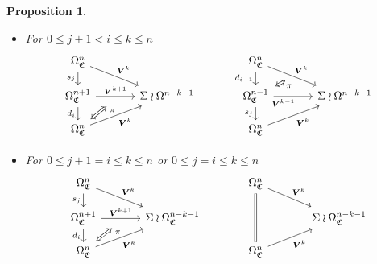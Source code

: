 \documentclass[a4paper,10pt
,draft
]{article}%
\numberwithin{equation}{section}
\numberwithin{figure}{section}
\newtheorem{proposition}[equation]{Proposition}%
\theoremstyle{definition} %
\newcommand{\1}{\ensuremath{\mathbbm 1}}%
\begin{document}
\begin{proposition}
\begin{itemize}
		\item[(DF1)]
		For $0 \leq j+1 < i \leq k \leq n $
		\begin{equation}
		\begin{tikzcd}[row sep = 12pt, column sep = 35pt]
		\Omega^{n}_{\mathfrak{C}}
		\arrow{dr}[swap,name=U]{}{\boldsymbol{V}^{k}} \arrow{d}[swap]{s_j} &
		&
		\Omega^{n}_{\mathfrak{C}}
		\arrow{dr}[swap,name=UUU]{}{\boldsymbol{V}^{k}} \arrow{d}[swap]{d_{i-1}} &
		\\
		|[alias=V]|
		\Omega^{n+1}_{\mathfrak{C}} \ar{r}{\boldsymbol{V}^{k+1}}[swap,name=UU]{} \arrow{d}[swap]{d_i}&
		\Sigma \wr \Omega^{n-k-1}
		&
		|[alias=VVV]|
		\Omega^{n-1}_{\mathfrak{C}} \ar{r}[near start, swap]{\boldsymbol{V}^{k-1}}[swap,name=UUUU]{} \ar{d}[swap]{s_j} &
		\Sigma \wr \Omega^{n-k-1}
		\\
		|[alias=VV]|
		\Omega^{n}_{\mathfrak{C}} \arrow{ur}[swap]{\boldsymbol{V}^{k}} &
		&
		|[alias=VVVV]|
		\Omega^{n}_{\mathfrak{C}} \arrow{ur}[swap]{\boldsymbol{V}^{k}} &
		\arrow[Leftrightarrow, from=VV, to=UU,shorten >=0.25cm,shorten <=0.05cm
		,swap,near end,"\pi"
		]
		\arrow[Leftrightarrow, from=VVV, to=UUU,shorten >=0.05cm,shorten <=0.05cm
		,swap,near end,"\pi"
		]
		\end{tikzcd}
		\end{equation}
		
		\item[(DF2)]
		For $0 \leq j+1 = i \leq k \leq n$ or 
		$0 \leq j = i \leq k \leq n$
		\begin{equation}
		\begin{tikzcd}[row sep = 12pt, column sep = 35pt]
		\Omega^n_{\mathfrak{C}}
		\arrow{dr}[swap,name=U]{}{\boldsymbol{V}^k} \arrow{d}[swap]{s_j} &
		&
		\Omega^n_{\mathfrak{C}}
		\arrow{dr}[swap,name=UUU]{}{\boldsymbol{V}^k} \arrow[equal]{dd} &
		\\
		|[alias=V]|
		\Omega^{n+1}_{\mathfrak{C}} \ar{r}{\boldsymbol{V}^{k+1}}[swap,name=UU]{} \arrow{d}[swap]{d_i}&
		\Sigma \wr \Omega^{n-k-1}_{\mathfrak{C}}
		&
		&
		\Sigma \wr \Omega^{n-k-1}_{\mathfrak{C}}
		\\
		|[alias=VV]|
		\Omega^{n}_{\mathfrak{C}} \arrow{ur}[swap]{\boldsymbol{V}^k} &
		&
		|[alias=VVVV]|
		\Omega^{n}_{\mathfrak{C}} \arrow{ur}[swap]{\boldsymbol{V}^k} &
		\arrow[Leftrightarrow, from=VV, to=UU,shorten >=0.25cm,shorten <=0.05cm
		,swap,near end,"\pi"
		]
		\end{tikzcd}
		\end{equation}
		

\end{itemize}
\end{proposition}
\end{document}
